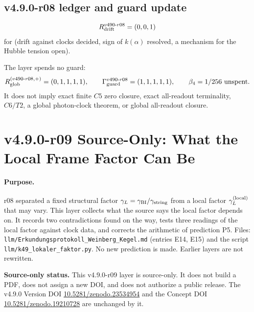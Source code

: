 \subsection*{v4.9.0-r08 ledger and guard update}
\label{subsec:v490-r08-ledger-guard}

\[
R_{\rm drift}^{v490\text{-}r08}=(0,0,1)
\]
for (drift against clocks decided, sign of \(k(\alpha)\) resolved, a mechanism for the Hubble tension open).

The layer spends no guard:
\[
R_{\rm glob}^{(v490\text{-}r08,+)}=(0,1,1,1,1),
\qquad
\Gamma_{\rm guard}^{v490\text{-}r08}=(1,1,1,1,1),
\qquad
\beta_4=1/256\ \text{unspent}.
\]
It does not imply exact finite \(C5\) zero closure, exact all-readout terminality,
\(C6/T2\), a global photon-clock theorem, or global all-readout closure.

\clearpage
\section*{v4.9.0-r09 Source-Only: What the Local Frame Factor Can Be}
\label{sec:v490-r09-local-frame-factor}

\paragraph{Purpose.}
r08 separated a fixed structural factor \(\gamma_L=\gamma_{\mathrm{BI}}/\gamma_{\mathrm{string}}\) from a local factor \(\gamma_L^{(\mathrm{local})}\) that may vary.
This layer collects what the source says the local factor depends on.  It records two contradictions found on the way,
tests three readings of the local factor against clock data, and corrects the arithmetic of prediction P5.  Files:
\texttt{llm/Erkundungsprotokoll\_Weinberg\_Kegel.md} (entries E14, E15) and the script
\texttt{llm/k49\_lokaler\_faktor.py}.  No new prediction is made.  Earlier layers are not rewritten.

\noindent\textbf{Source-only status.}
This v4.9.0-r09 layer is source-only.  It does not build a PDF, does not assign a new DOI,
and does not authorize a public release.  The v4.9.0 Version DOI
\href{https://doi.org/10.5281/zenodo.23534954}{10.5281/zenodo.23534954} and the Concept DOI
\href{https://doi.org/10.5281/zenodo.19210728}{10.5281/zenodo.19210728} are unchanged by it.

